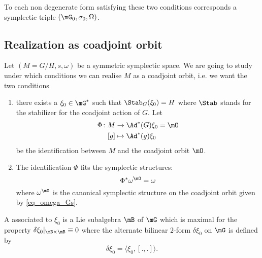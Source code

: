 To each non degenerate form satisfying these two conditions corresponds a symplectic triple $(\mG_0,\sigma_0,\Omega)$.

\subsection{Realization as coadjoint orbit}

Let $(M=G/H,s,\omega)$ be a symmetric symplectic space. We are going to study under which conditions we can realise $M$ as a coadjoint orbit, i.e. we want the two conditions
\begin{enumerate}

	\item
		there exists a $\xi_0\in\mG^*$ such that $\Stab_G(\xi_0)=H$ where $\Stab$ stands for the stabilizer for the coadjoint action of $G$. Let 
		\begin{equation}
			\begin{aligned}
				\Phi\colon M&\to \Ad^*(G)\xi_0=\mO \\
				[g]&\mapsto \Ad^*(g)\xi_0 
			\end{aligned}
		\end{equation}
		be the identification between $M$ and the coadjoint orbit $\mO$.
	\item
		The identification $\Phi$ fits the symplectic structures:
		\begin{equation}
			\Phi^*\omega^{\mO}=\omega
		\end{equation}
		where $\omega^{\mO}$ is the canonical symplectic structure on the coadjoint orbit given by \eqref{eq_omega_Gs}.
\end{enumerate}

\begin{definition}
	A  associated to $\xi_0$ is a Lie subalgebra $\mB$ of $\mG$ which is maximal for the property $\delta\xi_0|_{\mB\times \mB}\equiv 0$ where the alternate bilinear $2$-form $\delta\xi_0$ on $\mG$ is defined by
	\begin{equation}
		\delta\xi_0=\langle \xi_0, [.,.]\rangle.
	\end{equation}
\end{definition}

